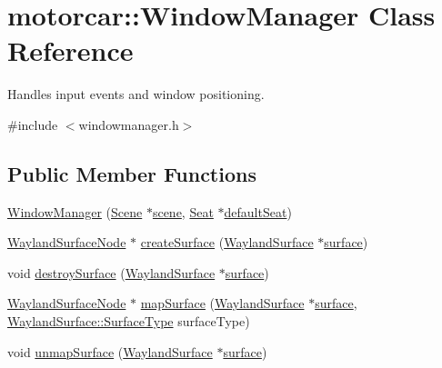 \hypertarget{classmotorcar_1_1WindowManager}{\section{motorcar\-:\-:Window\-Manager Class Reference}
\label{classmotorcar_1_1WindowManager}
}


Handles input events and window positioning.  




{\ttfamily \#include $<$windowmanager.\-h$>$}

\subsection*{Public Member Functions}
\begin{DoxyCompactItemize}
\item 
\hyperlink{classmotorcar_1_1WindowManager_a72f80d0967d0058275a5de49b79f5388}{Window\-Manager} (\hyperlink{classmotorcar_1_1Scene}{Scene} $\ast$\hyperlink{classmotorcar_1_1WindowManager_a98a3db98b4f0f5a78a7c3d115832be21}{scene}, \hyperlink{classmotorcar_1_1Seat}{Seat} $\ast$\hyperlink{classmotorcar_1_1WindowManager_a5497123fea0679ff61ef3a1cfca11464}{default\-Seat})
\item 
\hyperlink{classmotorcar_1_1WaylandSurfaceNode}{Wayland\-Surface\-Node} $\ast$ \hyperlink{classmotorcar_1_1WindowManager_a3de900878d15a3c161bc74925b115c9f}{create\-Surface} (\hyperlink{classmotorcar_1_1WaylandSurface}{Wayland\-Surface} $\ast$\hyperlink{simple-egl_8c_a0720952aa1caded45b5bcdce589663a9}{surface})
\item 
void \hyperlink{classmotorcar_1_1WindowManager_a4a5bd05b1d3ffee2c37fe0c9ebb08ca9}{destroy\-Surface} (\hyperlink{classmotorcar_1_1WaylandSurface}{Wayland\-Surface} $\ast$\hyperlink{simple-egl_8c_a0720952aa1caded45b5bcdce589663a9}{surface})
\item 
\hyperlink{classmotorcar_1_1WaylandSurfaceNode}{Wayland\-Surface\-Node} $\ast$ \hyperlink{classmotorcar_1_1WindowManager_afae4e71f7af8d60ffdc6fab320091246}{map\-Surface} (\hyperlink{classmotorcar_1_1WaylandSurface}{Wayland\-Surface} $\ast$\hyperlink{simple-egl_8c_a0720952aa1caded45b5bcdce589663a9}{surface}, \hyperlink{classmotorcar_1_1WaylandSurface_a7715a41b6776800656722407ec01e0a5}{Wayland\-Surface\-::\-Surface\-Type} surface\-Type)
\item 
void \hyperlink{classmotorcar_1_1WindowManager_a45035e963a1b1b503f3f8f04ae8c530b}{unmap\-Surface} (\hyperlink{classmotorcar_1_1WaylandSurface}{Wayland\-Surface} $\ast$\hyperlink{simple-egl_8c_a0720952aa1caded45b5bcdce589663a9}{surface})

\end{DoxyCompactItemize}
